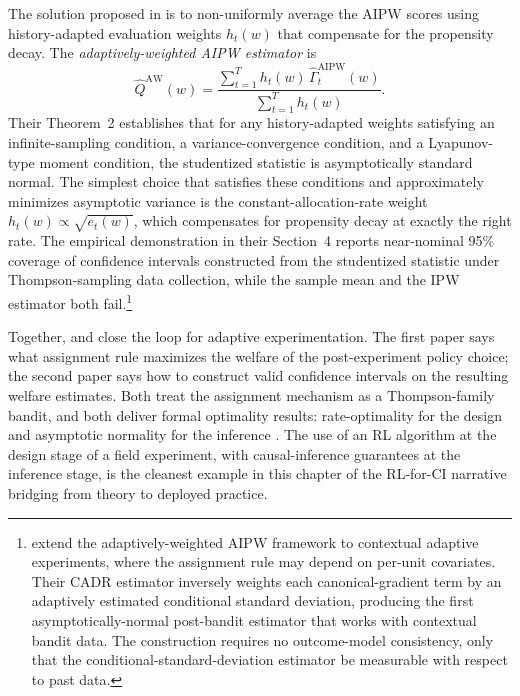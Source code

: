 The solution proposed in \citet{hadad2021adaptive} is to non-uniformly average the AIPW scores using history-adapted evaluation weights $h_t(w)$ that compensate for the propensity decay. The \emph{adaptively-weighted AIPW estimator} is
\begin{equation}
\hat Q^{\text{AW}}(w) = \frac{\sum_{t=1}^T h_t(w)\, \hat\Gamma_t^{\text{AIPW}}(w)}{\sum_{t=1}^T h_t(w)}.
\label{eq:adaptive_aipw}
\end{equation}
Their Theorem~2 establishes that for any history-adapted weights satisfying an infinite-sampling condition, a variance-convergence condition, and a Lyapunov-type moment condition, the studentized statistic is asymptotically standard normal. The simplest choice that satisfies these conditions and approximately minimizes asymptotic variance is the constant-allocation-rate weight $h_t(w) \propto \sqrt{e_t(w)}$, which compensates for propensity decay at exactly the right rate. The empirical demonstration in their Section~4 reports near-nominal 95\% coverage of confidence intervals constructed from the studentized statistic under Thompson-sampling data collection, while the sample mean and the IPW estimator both fail.\footnote{\citet{bibaut2021post} extend the adaptively-weighted AIPW framework to contextual adaptive experiments, where the assignment rule may depend on per-unit covariates. Their CADR estimator inversely weights each canonical-gradient term by an adaptively estimated conditional standard deviation, producing the first asymptotically-normal post-bandit estimator that works with contextual bandit data. The construction requires no outcome-model consistency, only that the conditional-standard-deviation estimator be measurable with respect to past data.}

Together, \citet{kasy2021adaptive} and \citet{hadad2021adaptive} close the loop for adaptive experimentation. The first paper says what assignment rule maximizes the welfare of the post-experiment policy choice; the second paper says how to construct valid confidence intervals on the resulting welfare estimates. Both treat the assignment mechanism as a Thompson-family bandit, and both deliver formal optimality results: rate-optimality for the design \citep[Theorem~1]{kasy2021adaptive} and asymptotic normality for the inference \citep[Theorem~2]{hadad2021adaptive}. The use of an RL algorithm at the design stage of a field experiment, with causal-inference guarantees at the inference stage, is the cleanest example in this chapter of the RL-for-CI narrative bridging from theory to deployed practice.

